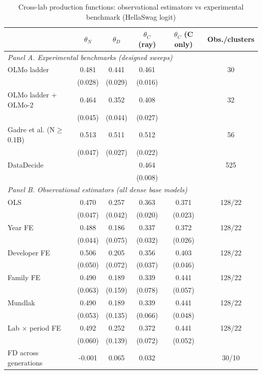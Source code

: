 \begin{table}[!htbp]
\centering
\scriptsize
\begin{threeparttable}
\caption{Cross-lab production functions: observational estimators vs experimental benchmark (HellaSwag logit)}
\label{tab:table6b_global_main}
\begin{tabular}{lccccc}
\toprule
 & $\theta_N$ & $\theta_D$ & $\theta_C$ (ray) & $\theta_C$ (C only) & Obs./clusters \\
\midrule
\multicolumn{6}{l}{\textit{Panel A. Experimental benchmarks (designed sweeps)}} \\
OLMo ladder & 0.481 & 0.441 & 0.461 &  & 30 \\
 & (0.028) & (0.029) & (0.016) &  &  \\
OLMo ladder + OLMo-2 & 0.464 & 0.352 & 0.408 &  & 32 \\
 & (0.045) & (0.044) & (0.027) &  &  \\
Gadre et al. (N$\geq$0.1B) & 0.513 & 0.511 & 0.512 &  & 56 \\
 & (0.047) & (0.027) & (0.022) &  &  \\
DataDecide &  &  & 0.464 &  & 525 \\
 &  &  & (0.008) &  &  \\
\midrule
\multicolumn{6}{l}{\textit{Panel B. Observational estimators (all dense base models)}} \\
OLS & 0.470 & 0.257 & 0.363 & 0.371 & 128/22 \\
 & (0.047) & (0.042) & (0.020) & (0.023) &  \\
Year FE & 0.488 & 0.186 & 0.337 & 0.372 & 128/22 \\
 & (0.044) & (0.075) & (0.032) & (0.026) &  \\
Developer FE & 0.506 & 0.205 & 0.356 & 0.403 & 128/22 \\
 & (0.050) & (0.072) & (0.037) & (0.046) &  \\
Family FE & 0.490 & 0.189 & 0.339 & 0.441 & 128/22 \\
 & (0.063) & (0.159) & (0.078) & (0.057) &  \\
Mundlak & 0.490 & 0.189 & 0.339 & 0.441 & 128/22 \\
 & (0.053) & (0.135) & (0.066) & (0.048) &  \\
Lab $\times$ period FE & 0.492 & 0.252 & 0.372 & 0.441 & 128/22 \\
 & (0.060) & (0.139) & (0.072) & (0.052) &  \\
FD across generations & -0.001 & 0.065 & 0.032 &  & 30/10 \\

\end{tabular}
\end{threeparttable}
\end{table}

